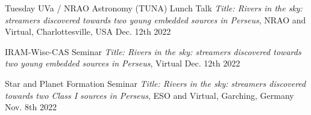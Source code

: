 


\begin{cvhonors}
	 \cvhonor
	{Tuesday UVa / NRAO Astronomy (TUNA) Lunch Talk} %
	{\textit{Title: Rivers in the sky: streamers discovered towards two young embedded sources in Perseus}, NRAO and Virtual, Charlottesville, USA} %
	{} %
	{Dec. 12th 2022} %
	
	 \cvhonor
	{IRAM-Wisc-CAS Seminar} %
	{\textit{Title: Rivers in the sky: streamers discovered towards two young embedded sources in Perseus}, Virtual} %
	{} %
	{Dec. 12th 2022} %
	
	 \cvhonor
	{Star and Planet Formation Seminar} %
	{\textit{Title: Rivers in the sky: streamers discovered towards two Class I sources in Perseus}, ESO and Virtual, Garching, Germany} %
	{} %
	{Nov. 8th 2022} %
	
\end{cvhonors}


